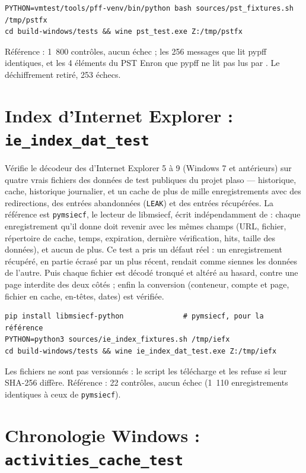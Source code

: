 \documentclass[11pt,a4paper,oneside]{report}
\begin{document}
\begin{lstlisting}
PYTHON=vmtest/tools/pff-venv/bin/python bash sources/pst_fixtures.sh /tmp/pstfx
cd build-windows/tests && wine pst_test.exe Z:/tmp/pstfx
\end{lstlisting}

Référence : 1~800 contrôles, aucun échec ; les 256 messages que lit pypff
identiques, et les 4 éléments du PST Enron que pypff ne lit pas lus par
\wac{}. Le déchiffrement retiré, 253 échecs.

\section{Index d'Internet Explorer : \texttt{ie\_index\_dat\_test}}

Vérifie le décodeur des  d'Internet Explorer 5 à 9
(Windows 7 et antérieurs) sur quatre vrais fichiers des données de test
publiques du projet plaso — historique, cache, historique journalier, et un
cache de plus de mille enregistrements avec des redirections, des entrées
abandonnées (\texttt{LEAK}) et des entrées récupérées. La référence est
\texttt{pymsiecf}, le lecteur de libmsiecf, écrit indépendamment de \wac{} :
chaque enregistrement qu'il donne doit revenir avec les mêmes champs (URL,
fichier, répertoire de cache, temps, expiration, dernière vérification, hits,
taille des données), et aucun de plus. Ce test a pris un défaut réel : un
enregistrement récupéré, en partie écrasé par un plus récent, rendait comme
siennes les données de l'autre. Puis chaque fichier est décodé tronqué et
altéré au hasard, contre une page interdite des deux côtés ; enfin la
conversion (conteneur, compte et page, fichier en cache, en-têtes, dates)
est vérifiée.

\begin{lstlisting}
pip install libmsiecf-python              # pymsiecf, pour la référence
PYTHON=python3 sources/ie_index_fixtures.sh /tmp/iefx
cd build-windows/tests && wine ie_index_dat_test.exe Z:/tmp/iefx
\end{lstlisting}

Les fichiers ne sont pas versionnés : le script les télécharge et les refuse
si leur SHA-256 diffère. Référence : 22 contrôles, aucun échec (1~110
enregistrements identiques à ceux de \texttt{pymsiecf}).

\section{Chronologie Windows : \texttt{activities\_cache\_test}}
\end{document}
